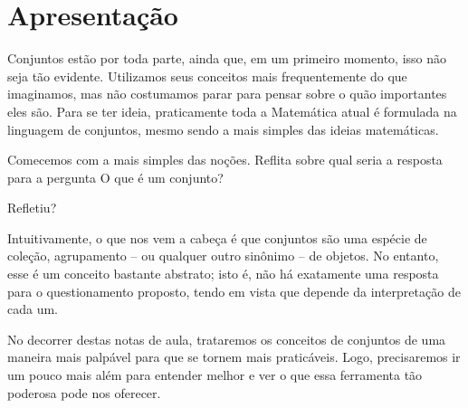 \section{Apresentação}

Conjuntos estão por toda parte, ainda que, em um primeiro momento, isso não seja tão evidente. Utilizamos seus conceitos mais frequentemente do que imaginamos, mas não costumamos parar para pensar sobre o quão importantes eles são.
Para se ter ideia, praticamente toda a Matemática atual é formulada na linguagem de conjuntos, mesmo sendo a mais simples das ideias matemáticas.

Comecemos com a mais simples das noções. Reflita sobre qual seria a resposta para a pergunta \abreaspas O que é um conjunto?\fechaaspas

\reticencias Refletiu?

Intuitivamente, o que nos vem a cabeça é que conjuntos são uma espécie de coleção, agrupamento -- ou qualquer outro sinônimo -- de objetos.
No entanto, esse é um conceito bastante abstrato; isto é, não há exatamente uma resposta para o questionamento proposto, tendo em vista que depende da interpretação de cada um.

No decorrer destas notas de aula, trataremos os conceitos de conjuntos de uma maneira mais palpável para que se tornem mais praticáveis.
Logo, precisaremos ir um pouco mais além para entender melhor e ver o que essa ferramenta tão poderosa pode nos oferecer.
